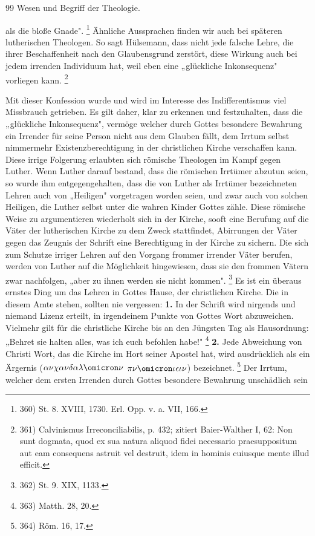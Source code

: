 \hfill 99 \hfill Wesen und Begriff der Theologie. \par als die bloße Gnade". \footnote{360) St. 8. XVIII, 1730. Erl. Opp. v. a. VII, 166.} Ähnliche Aussprachen finden wir auch bei späteren lutherischen Theologen. So sagt Hülsemann, dass nicht jede falsche Lehre, die ihrer Beschaffenheit nach den Glaubensgrund zerstört, diese Wirkung auch bei jedem irrenden Individuum hat, weil eben eine „glückliche Inkonsequenz" vorliegen kann. \footnote{361) Calvinismus Irreconciliabilis, p. 432; zitiert Baier-Walther I, 62: Non sunt dogmata, quod ex sua natura aliquod fidei necessario praesuppositum aut eam consequens astruit vel destruit, idem in hominis cuiusque mente illud efficit.} \par Mit dieser Konfession wurde und wird im Interesse des Indifferentismus viel Missbrauch getrieben. Es gilt daher, klar zu erkennen und festzuhalten, dass die „glückliche Inkonsequenz", vermöge welcher durch Gottes besondere Bewahrung ein Irrender für seine Person nicht aus dem Glauben fällt, dem Irrtum selbst nimmermehr Existenzberechtigung in der christlichen Kirche verschaffen kann. Diese irrige Folgerung erlaubten sich römische Theologen im Kampf gegen Luther. Wenn Luther darauf bestand, dass die römischen Irrtümer abzutun seien, so wurde ihm entgegengehalten, dass die von Luther als Irrtümer bezeichneten Lehren auch von „Heiligen" vorgetragen worden seien, und zwar auch von solchen Heiligen, die Luther selbst unter die wahren Kinder Gottes zähle. Diese römische Weise zu argumentieren wiederholt sich in der Kirche, sooft eine Berufung auf die Väter der lutherischen Kirche zu dem Zweck stattfindet, Abirrungen der Väter gegen das Zeugnis der Schrift eine Berechtigung in der Kirche zu sichern. Die sich zum Schutze irriger Lehren auf den Vorgang frommer irrender Väter berufen, werden von Luther auf die Möglichkeit hingewiesen, dass sie den frommen Vätern zwar nachfolgen, „aber zu ihnen werden sie nicht kommen". \footnote{362) St. 9. XIX, 1133.} Es ist ein überaus ernstes Ding um das Lehren in Gottes Hause, der christlichen Kirche. Die in diesem Amte stehen, sollten nie vergessen: \textbf{1.} In der Schrift wird nirgends und niemand Lizenz erteilt, in irgendeinem Punkte von Gottes Wort abzuweichen. Vielmehr gilt für die christliche Kirche bis an den Jüngsten Tag als Hausordnung: „Behret sie halten alles, was ich euch befohlen habe!" \footnote{363) Matth. 28, 20.} \textbf{2.} Jede Abweichung von Christi Wort, das die Kirche im Hort seiner Apostel hat, wird ausdrücklich als ein Ärgernis ($\alpha\nu\chi\alpha\nu\delta\alpha\lambda\omicron\nu$ $\pi\nu\omicron\iota\epsilon\iota\nu$) bezeichnet. \footnote{364) Röm. 16, 17.} Der Irrtum, welcher dem ersten Irrenden durch Gottes besondere Bewahrung unschädlich sein